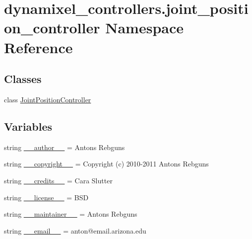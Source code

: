 \hypertarget{namespacedynamixel__controllers_1_1joint__position__controller}{}\section{dynamixel\+\_\+controllers.\+joint\+\_\+position\+\_\+controller Namespace Reference}
\label{namespacedynamixel__controllers_1_1joint__position__controller}
\subsection*{Classes}
\begin{DoxyCompactItemize}
\item 
class \hyperlink{classdynamixel__controllers_1_1joint__position__controller_1_1_joint_position_controller}{Joint\+Position\+Controller}
\end{DoxyCompactItemize}
\subsection*{Variables}
\begin{DoxyCompactItemize}
\item 
string \hyperlink{namespacedynamixel__controllers_1_1joint__position__controller_a41e555c7c0781b7e27ce4121b7b19496}{\+\_\+\+\_\+author\+\_\+\+\_\+} = \textquotesingle{}Antons Rebguns\textquotesingle{}
\item 
string \hyperlink{namespacedynamixel__controllers_1_1joint__position__controller_a099e0e57ac9fd62b4f3445d37b4d8ac2}{\+\_\+\+\_\+copyright\+\_\+\+\_\+} = \textquotesingle{}Copyright (c) 2010-\/2011 Antons Rebguns\textquotesingle{}
\item 
string \hyperlink{namespacedynamixel__controllers_1_1joint__position__controller_a687a1cf304030543bfba7bf5f0f63900}{\+\_\+\+\_\+credits\+\_\+\+\_\+} = \textquotesingle{}Cara Slutter\textquotesingle{}
\item 
string \hyperlink{namespacedynamixel__controllers_1_1joint__position__controller_a179a108e8739a20bba89d0aa91b23cba}{\+\_\+\+\_\+license\+\_\+\+\_\+} = \textquotesingle{}B\+SD\textquotesingle{}
\item 
string \hyperlink{namespacedynamixel__controllers_1_1joint__position__controller_a30510e434ccdcd91cb8577c3da29170d}{\+\_\+\+\_\+maintainer\+\_\+\+\_\+} = \textquotesingle{}Antons Rebguns\textquotesingle{}
\item 
string \hyperlink{namespacedynamixel__controllers_1_1joint__position__controller_aef8d9f353c9981c08af86f78beb4eab7}{\+\_\+\+\_\+email\+\_\+\+\_\+} = \textquotesingle{}anton@email.\+arizona.\+edu\textquotesingle{}
\end{DoxyCompactItemize}


